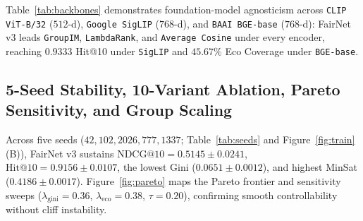 \documentclass[final,5p,twocolumn]{elsarticle}
\begin{document}
Table~\ref{tab:backbones} demonstrates foundation-model agnosticism across \texttt{CLIP ViT-B/32} ($512$-d), \texttt{Google SigLIP} ($768$-d), and \texttt{BAAI BGE-base} ($768$-d): FairNet v3 leads \texttt{GroupIM}, \texttt{LambdaRank}, and \texttt{Average Cosine} under every encoder, reaching $0.9333$ Hit@10 under \texttt{SigLIP} and $45.67\%$ Eco Coverage under \texttt{BGE-base}.

\begin{table}[t]
\centering
\caption{3-Backbone Foundation Encoder Comparison on Sydney ($n{=}180$).}
\label{tab:backbones}
\end{table}

\subsection{5-Seed Stability, 10-Variant Ablation, Pareto Sensitivity, and Group Scaling}
Across five seeds ($42, 102, 2026, 777, 1337$; Table~\ref{tab:seeds} and Figure~\ref{fig:train}(B)), FairNet v3 sustains $\text{NDCG@10} = 0.5145 \pm 0.0241$, $\text{Hit@10} = 0.9156 \pm 0.0107$, the lowest Gini ($0.0651 \pm 0.0012$), and highest MinSat ($0.4186 \pm 0.0017$). Figure~\ref{fig:pareto} maps the Pareto frontier and sensitivity sweeps ($\lambda_{\text{gini}}{=}0.36$, $\lambda_{\text{eco}}{=}0.38$, $\tau{=}0.20$), confirming smooth controllability without cliff instability.
\end{document}
